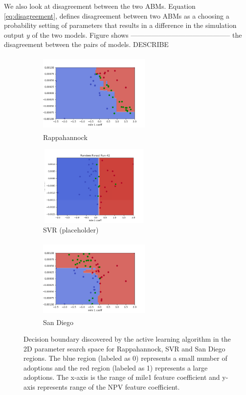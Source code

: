 We also look at disagreement between the two ABMs. Equation \ref{eq:disagreement}, defines disagreement between two ABMs as a choosing a probability setting of parameters that results in a difference in the simulation output $y$ of the two models. Figure  shows -------------------------------------------- the disagreement between the pairs of models. {\color{magenta}DESCRIBE }



\begin{figure}
\begin{subfigure}{.3\textwidth}
  \includegraphics[width=5.5cm,height=4cm]{AAMAS20Template-submission/figures/rapp-book17-final-RF.png}
  \caption{Rappahannock}
  \label{fig:diagstdev}
\end{subfigure}%
\begin{subfigure}{.3\textwidth}
  \includegraphics[width=5.5cm,height=4cm]{AAMAS20Template-submission/figures/svrbook6-random-forest-run42.png}
  \caption{SVR (placeholder)}
  \label{fig:}
\end{subfigure}%
\begin{subfigure}{.3\textwidth}
  \includegraphics[width=5.5cm,height=4cm]{AAMAS20Template-submission/figures/sandia-book9-RF.png}
  \caption{San Diego}
  \label{fig:}
\end{subfigure}
\caption{Decision boundary discovered by the active learning algorithm in the 2D parameter search space for Rappahannock, SVR and San Diego regions. The blue region (labeled as 0) represents a small number of adoptions and the red region (labeled as 1) represents a large adoptions. The x-axis is the range of mile1 feature coefficient and y-axis represents range of the NPV feature coefficient.}
\label{fig:activeResult}
\end{figure}


